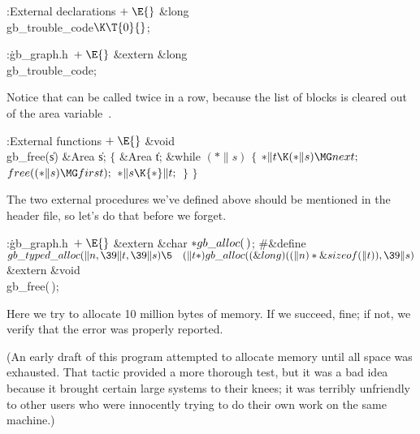 \B{}:External declarations\X${}\mathrel+\E{}$\6
\&{long} \\{gb\_trouble\_code}${}\K\T{0}{}$;\par
\fi

\B{}:\.{gb\_graph.h\,}\X${}\mathrel+\E{}$\6
\&{extern} \&{long} \\{gb\_trouble\_code};\par
\fi

Notice that  can be called twice in a row, because
the list
of blocks is cleared out of the area variable~.

\Y\B\4:External functions\X${}\mathrel+\E{}$\6
\1\1\&{void} \\{gb\_free}(\|s)\6
\&{Area} \|s;\2\2\6
${}\{{}$\5
\1\&{Area} \|t;\7
\&{while} ${}({*}\|s){}$\5
${}\{{}$\1\6
${}{*}\|t\K({*}\|s)\MG\\{next};{}$\6
${}\\{free}(({*}\|s)\MG\\{first});{}$\6
${}{*}\|s\K{*}\|t;{}$\6
\4${}\}{}$\2\6
\4${}\}{}$\2\par
\fi

The two external procedures we've defined above should be mentioned in
the header file, so let's do that before we forget.

\Y\B\4:\.{gb\_graph.h\,}\X${}\mathrel+\E{}$\6
\&{extern} \&{char} ${}{*}\\{gb\_alloc}(\,){}$;\6
\8\#\&{define} ${}\\{gb\_typed\_alloc}(\|n,\39\|t,\39\|s)\5\hbox{\quad}(\|t*)%
\\{gb\_alloc}((\&{long})((\|n)*\&{sizeof}(\|t)),\39\|s){}$\6
\&{extern} \&{void} \\{gb\_free}(\,);\par
\fi

Here we try to allocate 10 million bytes of memory. If we succeed,
fine; if not, we verify that the error was properly reported.

(An early draft of this program attempted to allocate memory until all
space was exhausted. That tactic provided a more thorough test, but it
was a bad idea because it brought certain large systems to their
knees; it was terribly unfriendly to other users who were innocently
trying to do their own work on the same machine.)


